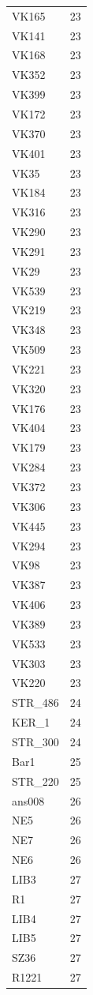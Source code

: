 \begin{longtable}[t]{ll}
VK165 & 23\\
VK141 & 23\\
VK168 & 23\\
VK352 & 23\\
VK399 & 23\\
VK172 & 23\\
VK370 & 23\\
VK401 & 23\\
VK35 & 23\\
VK184 & 23\\
VK316 & 23\\
VK290 & 23\\
VK291 & 23\\
VK29 & 23\\
VK539 & 23\\
VK219 & 23\\
VK348 & 23\\
VK509 & 23\\
VK221 & 23\\
VK320 & 23\\
VK176 & 23\\
VK404 & 23\\
VK179 & 23\\
VK284 & 23\\
VK372 & 23\\
VK306 & 23\\
VK445 & 23\\
VK294 & 23\\
VK98 & 23\\
VK387 & 23\\
VK406 & 23\\
VK389 & 23\\
VK533 & 23\\
VK303 & 23\\
VK220 & 23\\
STR\_486 & 24\\
KER\_1 & 24\\
STR\_300 & 24\\
Bar1 & 25\\
STR\_220 & 25\\
ans008 & 26\\
NE5 & 26\\
NE7 & 26\\
NE6 & 26\\
LIB3 & 27\\
R1 & 27\\
LIB4 & 27\\
LIB5 & 27\\
SZ36 & 27\\
R1221 & 27\\

\end{longtable}
